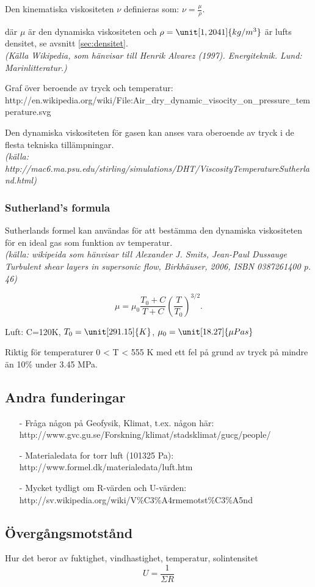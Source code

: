 Den kinematiska viskositeten $\nu$ definieras som: $\nu = \frac {\mu} {\rho}.$

där $\mu$ är den dynamiska viskositeten och $\rho=\unit[1,2041]{kg/m^3}$ är lufts densitet, se avsnitt \ref{sec:densitet}.\\
\emph{(Källa Wikipedia, som hänvisar till Henrik Alvarez (1997). Energiteknik. Lund: Marinlitteratur.)}

Graf över beroende av tryck och temperatur:\\
http://en.wikipedia.org/wiki/File:Air\_dry\_dynamic\_visocity\_on\_pressure\_temperature.svg

Den dynamiska viskositeten för gasen kan anses vara oberoende av tryck i de flesta tekniska tillämpningar. \\
\emph{(källa: http://mac6.ma.psu.edu/stirling/simulations/DHT/ViscosityTemperatureSutherland.html)}

\subsubsection{Sutherland's formula}
Sutherlands formel kan användas för att bestämma den dynamiska viskositeten för en ideal gas som funktion av temperatur.\\
\emph{(källa: wikipeida som hänvisar till Alexander J. Smits, Jean-Paul Dussauge Turbulent shear layers in supersonic flow, Birkhäuser, 2006, ISBN 0387261400 p. 46)}

\begin{equation}
{\mu} = {\mu}_0 \frac {T_0+C} {T + C} \left (\frac {T} {T_0} \right )^{3/2}.
\end{equation}

Luft: C=120K, $T_0=\unit[291.15]{K}$, $\mu_0=\unit[18.27]{\mu Pa s}$

Riktig för temperaturer 0 < T < 555 K med ett fel på grund av tryck på mindre än 10\% under 3.45 MPa.



\subsection{Andra funderingar}
\begin{itemize}
\item[-] Fråga någon på Geofysik, Klimat, t.ex. någon här: \\
http://www.gvc.gu.se/Forskning/klimat/stadsklimat/gucg/people/
\item[-] Materialedata for torr luft (101325 Pa): http://www.formel.dk/materialedata/luft.htm
\item[-] Mycket tydligt om R-värden och U-värden: \\
http://sv.wikipedia.org/wiki/V\%C3\%A4rmemotst\%C3\%A5nd
\end{itemize}



\subsection{Övergångsmotstånd}
Hur det beror av fuktighet, vindhastighet, temperatur, solintensitet
\begin{equation}
U=\frac{1}{\Sigma R}
\end{equation}